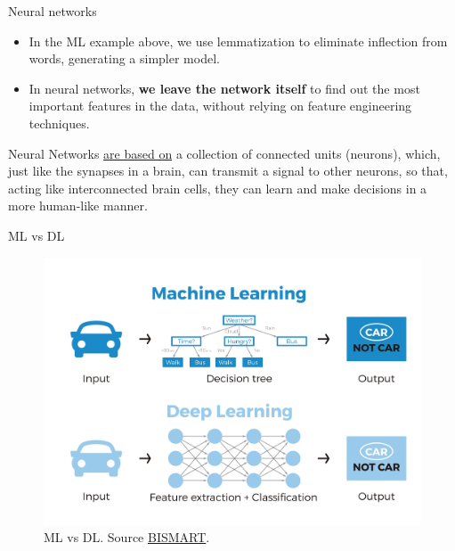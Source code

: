 \documentclass{beamer}
\begin{document}
\begin{frame}{Neural networks}
    \begin{itemize}
        \item In the ML example above, we use lemmatization to eliminate inflection from words, generating a simpler model.
        \item In neural networks, {\bf we leave the network itself} to find out the most important features in the data, without relying on feature engineering techniques. 
    \end{itemize}
    Neural Networks \href{https://towardsdatascience.com/deep-learning-with-python-neural-networks-complete-tutorial-6b53c0b06af0}{are based on} a collection of connected units (neurons), which, just like the synapses in a brain, can transmit a signal to other neurons, so that, acting like interconnected brain cells, they can learn and make decisions in a more human-like manner.\cite{nielsen_neural_2015}
\end{frame}

\begin{frame}{ML vs DL}
    \begin{figure}
        \includegraphics[width=0.8\linewidth]{MLvsDL}
        \caption{ML vs DL. Source \href{https://blog.bismart.com/diferencia-machine-learning-deep-learning}{BISMART}.}
        \label{Fig:MLvsDL}
    \end{figure}
\end{frame}
\end{document}
